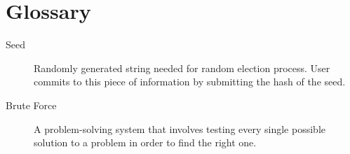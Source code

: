 \chapter*{Glossary}


\begin{description}
  \item[Seed] Randomly generated string needed for random election process. User commits to this piece of information by submitting the hash of the seed.
  \item[Brute Force] A problem-solving system that involves testing every single possible solution to a problem in order to find the right one.
\end{description}
